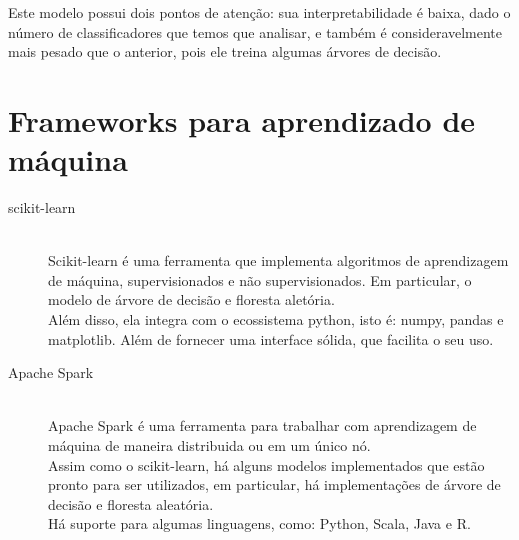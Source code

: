 \begin{description}
    Este modelo possui dois pontos de atenção: sua interpretabilidade é baixa, dado o número de classificadores que temos que analisar, e também é consideravelmente mais pesado que o anterior, pois ele treina algumas árvores de decisão.
\end{description}

\section{Frameworks para aprendizado de máquina}

\begin{description}
    \item[scikit-learn] \hfill \\ Scikit-learn é uma ferramenta que implementa algoritmos de aprendizagem de máquina, supervisionados e não supervisionados. Em particular, o modelo de árvore de decisão e floresta aletória.\\ 
    Além disso, ela integra com o ecossistema python, isto é: numpy, pandas e matplotlib. Além de fornecer uma interface sólida, que facilita o seu uso. 

    \item[Apache Spark] \hfill \\ Apache Spark é uma ferramenta para trabalhar com aprendizagem de máquina de maneira distribuida ou em um único nó. \\
    Assim como o scikit-learn, há alguns modelos implementados que estão pronto para ser utilizados, em particular, há implementações de árvore de decisão e floresta aleatória. \\
    Há suporte para algumas linguagens, como: Python, Scala, Java e R.
\end{description}